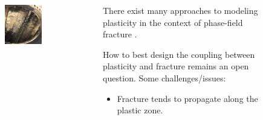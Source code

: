 \begin{frame}
\begin{columns}
\begin{column}{0.2\textwidth}
\begin{figure}
\begin{subfigure}{\textwidth}
        \end{subfigure}
        \begin{subfigure}{\textwidth}
          \centering
          \includegraphics[width=\textwidth]{Chapter1/figures/spallation}
        \end{subfigure}
      \end{figure}
    \end{column}
    \begin{column}{0.8\textwidth}
      \vspace{1em}
      
      There exist many approaches to modeling plasticity in the context of phase-field fracture \cite{alessi_gradient_2014, alessi_gradient_2015, alessi_coupling_2018, ambati_phase-field_2015, ambati2016phase, miehe_phase_2016, borden2016phase, borden_phase-field_2017}.
      
      \bigskip
      \pause
      
      How to best design the \textcolor{peggyblue}{coupling} between plasticity and fracture remains an open question. Some challenges/issues:
      \begin{itemize}
        \item<3-> Fracture tends to propagate along the plastic zone.
        

\end{itemize}
\end{column}
\end{columns}
\end{frame}
